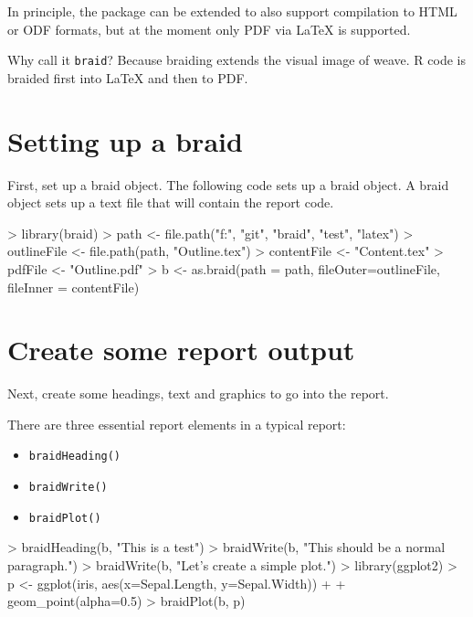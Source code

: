 \documentclass[a4paper]{article}
\newcommand{\braid}{{\tt braid}}
\newcommand{\code}[1]{{\tt #1}}
\begin{document}
In principle, the package can be extended to also support compilation to HTML or ODF formats, but at the moment only PDF via \LaTeX{} is supported.

Why call it \braid{}?  Because braiding extends the visual image of weave. R code is braided first into \LaTeX{} and then to PDF. 


\section{Setting up a braid}

First, set up a braid object.  The following code sets up a braid object.  A braid object sets up a text file that will contain the report code.

\begin{Schunk}
\begin{Sinput}
> library(braid)
> path <- file.path("f:", "git", "braid", "test", "latex")
> outlineFile <- file.path(path, "Outline.tex")
> contentFile <- "Content.tex"
> pdfFile <- "Outline.pdf"
> b <- as.braid(path = path, fileOuter=outlineFile, fileInner = contentFile)
\end{Sinput}
\end{Schunk}

\section{Create some report output}

Next, create some headings, text and graphics to go into the report.

There are three essential report elements in a typical report:

\begin{itemize}
	\item \code{braidHeading()}
	\item \code{braidWrite()}
	\item \code{braidPlot()}
\end{itemize}


\begin{Schunk}
\begin{Sinput}
> braidHeading(b, "This is a test")
> braidWrite(b, "This should be a normal paragraph.")
> braidWrite(b, "Let's create a simple plot.")
> library(ggplot2)
> p <- ggplot(iris, aes(x=Sepal.Length, y=Sepal.Width)) + 
+     geom_point(alpha=0.5)
> braidPlot(b, p)
\end{Sinput}
\end{Schunk}
\end{document}
